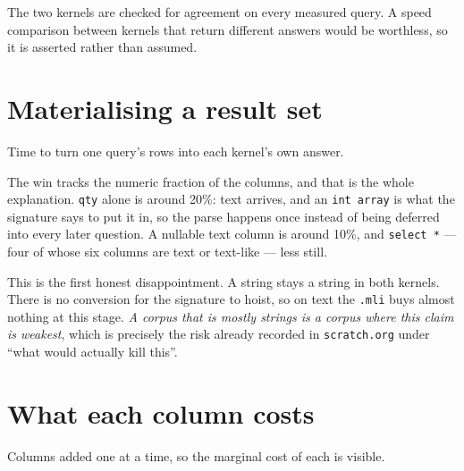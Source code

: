 \documentclass[11pt,a4paper]{article}
\begin{document}
\noindent
The two kernels are checked for agreement on every measured query. A speed comparison
between kernels that return different answers would be worthless, so it is asserted
rather than assumed.

\section{Materialising a result set}

Time to turn one query's rows into each kernel's own answer.

\begin{center}
\end{center}

The win tracks the numeric fraction of the columns, and that is the whole explanation.
\texttt{qty} alone is around 20\%: text arrives, and an \texttt{int array} is what the
signature says to put it in, so the parse happens once instead of being deferred into
every later question. A nullable text column is around 10\%, and \texttt{select *}
--- four of whose six columns are text or text-like --- less still.

This is the first honest disappointment. A string stays a string in both kernels.
There is no conversion for the signature to hoist, so on text the \texttt{.mli} buys
almost nothing at this stage. \emph{A corpus that is mostly strings is a corpus where
this claim is weakest}, which is precisely the risk already recorded in
\texttt{scratch.org} under ``what would actually kill this''.

\section{What each column costs}

Columns added one at a time, so the marginal cost of each is visible.

\begin{center}
\end{center}
\end{document}
